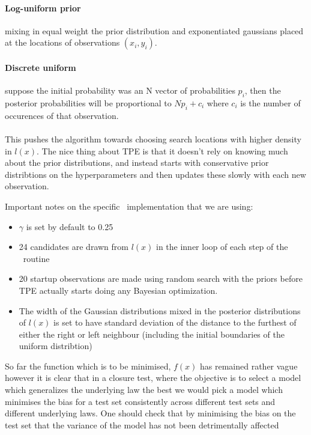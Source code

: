 \paragraph[]{Log-uniform prior}
mixing in equal weight the prior distribution and exponentiated gaussians placed
at the locations of observations $(x_i, y_i)$.
\paragraph[]{Discrete uniform}
suppose the initial probability was an N vector of probabilities $p_i$, then
the posterior probabilities will be proportional to $Np_i + c_i$ where $c_i$ is
the number of occurences of that observation.
\paragraph{}
This pushes the algorithm towards choosing search locations with
higher density in $l(x)$. The nice thing about TPE is that it doesn't rely on knowing
much about the prior distributions, and instead starts with conservative prior
distribtions on the hyperparameters and then updates these slowly with each new
observation.

Important notes on the specific \hyperopt\ implementation that we are using:
\begin{itemize}
    \item $\gamma$ is set by default to 0.25
    \item 24 candidates are drawn from $l(x)$ in the inner loop of each step of
        the \hyperopt\ routine
    \item 20 startup observations are made using random search with the priors before
        TPE actually starts doing any Bayesian optimization.
    \item The width of the Gaussian distributions mixed in the posterior
    distributions of $l(x)$ is set to have standard deviation of the distance to
    the furthest of either the right or left neighbour (including the initial
    boundaries of the uniform distribtion)
\end{itemize}

So far the function which is to be minimised, $f(x)$ has remained rather vague
however it is clear that in a closure test, where the objective is to select a
model which generalizes the underlying law the best we would pick a model
which minimises the bias for a test set consistently across different test sets
and different underlying laws. One should check that by minimising the bias on
the test set that the variance of the model has not been detrimentally affected